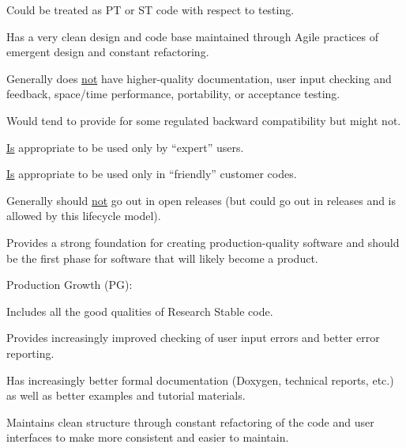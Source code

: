 \documentclass[11pt]{SANDreport}
\begin{document}
\begin{compactenum}
\begin{compactitem}
{}\item Could be treated as PT or ST code with respect to testing.

{}\item Has a very clean design and code base maintained through Agile practices of emergent design and constant refactoring.

{}\item Generally does {}\underline{not} have higher-quality documentation, user input checking and feedback, space/time performance, portability, or acceptance testing.

{}\item Would tend to provide for some regulated backward
compatibility but might not.

{}\item {}\underline{Is} appropriate to be used only by ``expert''
users.

{}\item {}\underline{Is} appropriate to be used only in ``friendly''
customer codes.

{}\item Generally should {}\underline{not} go out in open releases (but could go out in releases and is allowed by this lifecycle model).

{}\item Provides a strong foundation for creating production-quality software and should be the first phase for software that will likely
become a product.

\end{compactitem}

{}\item Production Growth (PG):

\begin{compactitem}

{}\item Includes all the good qualities of Research Stable code.

{}\item Provides increasingly improved checking of user input errors and better error reporting.

{}\item Has increasingly better formal documentation (Doxygen, technical reports, etc.) as well as better examples and tutorial materials.

{}\item Maintains clean structure through constant refactoring of the code and user interfaces to make more consistent and easier to maintain.


\end{compactitem}
\end{compactenum}
\end{document}
